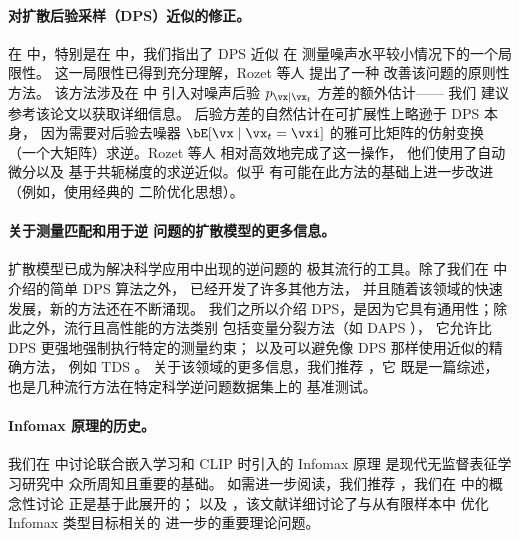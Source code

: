 \documentclass[../../book-main_zh.tex]{subfiles}
\begin{document}
\paragraph{对扩散后验采样（DPS）近似的修正。}
在  中，特别是在
 中，我们指出了
DPS 近似
 在
测量噪声水平较小情况下的一个局限性。
这一局限性已得到充分理解，Rozet 等人 \cite{rozet2024learning} 提出了一种
改善该问题的原则性方法。
该方法涉及在  中
引入对噪声后验 $p_{\vx \mid \vx_t}$ 方差的额外估计——
我们
建议参考该论文以获取详细信息。
后验方差的自然估计在可扩展性上略逊于 DPS 本身，
因为需要对后验去噪器 $\bE[\vx \mid \vx_t=\vxi]$ 的雅可比矩阵的仿射变换
（一个大矩阵）求逆。Rozet 等人 \cite{rozet2024learning}
相对高效地完成了这一操作，
他们使用了自动微分以及
基于共轭梯度的求逆近似。似乎
有可能在此方法的基础上进一步改进（例如，使用经典的
二阶优化思想）。

\paragraph{关于测量匹配和用于逆
问题的扩散模型的更多信息。}

扩散模型已成为解决科学应用中出现的逆问题的
极其流行的工具。除了我们在  中
介绍的简单 DPS 算法之外，
已经开发了许多其他方法，
并且随着该领域的快速发展，新的方法还在不断涌现。
我们之所以介绍 DPS，是因为它具有通用性；除此之外，流行且高性能的方法类别
包括变量分裂方法（如 DAPS
\cite{Zhang2024-ha}），
它允许比 DPS 更强地强制执行特定的测量约束；
以及可以避免像 DPS 那样使用近似的精确方法，
例如 TDS \cite{wu2023practical}。
关于该领域的更多信息，我们推荐 \cite{zheng2025inversebench}，它
既是一篇综述，也是几种流行方法在特定科学逆问题数据集上的
基准测试。

\paragraph{Infomax 原理的历史。}
我们在  中讨论联合嵌入学习和 CLIP 时引入的
Infomax 原理 \cite{infomax} 是现代无监督表征学习研究中
众所周知且重要的基础。
如需进一步阅读，我们推荐
\cite{Van_den_Oord2018-qf}，我们在  中的概念性讨论
正是基于此展开的；
以及 \cite{Oko2025-wk}，该文献详细讨论了与从有限样本中
优化 Infomax 类型目标相关的
进一步的重要理论问题。
\end{document}
